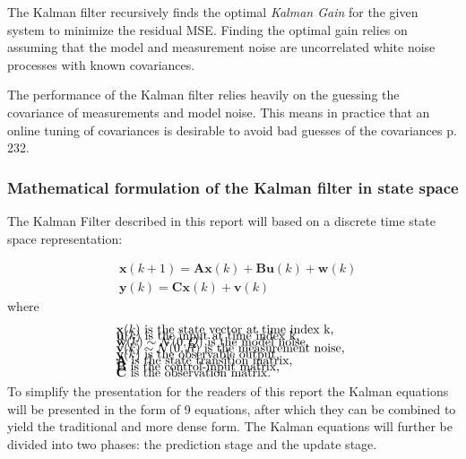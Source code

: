The Kalman filter recursively finds the optimal \textit{Kalman Gain} for the given system to minimize the residual MSE. Finding the optimal gain relies on assuming that the model and measurement noise are uncorrelated white noise processes with known covariances. 

The performance of the Kalman filter relies heavily on the guessing the covariance of measurements and model noise. This means in practice that an online tuning of covariances is desirable to avoid bad guesses of the covariances \cite{Doraiswami2014} p. 232.

\subsubsection{Mathematical formulation of the Kalman filter in state space}
The Kalman Filter described in this report will based on a discrete time state space representation: 

\begin{align}
	&\textbf{x}(k+1) = \textbf{A}\textbf{x}(k) + \textbf{B}\textbf{u}(k) + \textbf{w}(k)  \label{eq:KalmanSystemEquations} \\
	&\textbf{y}(k) = \textbf{C}\textbf{x}(k)+\textbf{v}(k) 
\end{align}
where 
\begin{align*}
	&\text{$\textbf{x}(k)$ is the state vector at time index k,					}	\\[-1em]
	&\text{$\textbf{u}(k)$ is the input at time index k, 						}	\\[-1em]
	&\text{$\textbf{w}(k) \sim \mathcal{N}(0, Q)$ is the model noise,			}	\\[-1em]
	&\text{$\textbf{v}(k) \sim \mathcal{N}(0, R)$ is the measurement noise,		}	\\[-1em]
	&\text{$\textbf{y}(k)$ is the observable output, 							}	\\[-1em]
	&\text{\textbf{A} is the state transition matrix,							}	\\[-1em]
	&\text{\textbf{B} is the control-input matrix,								}	\\[-1em]
	&\text{\textbf{C} is the observation matrix. 								}	\\[-1em]
\end{align*}

To simplify the presentation for the readers of this report the Kalman equations will be presented in the form of 9 equations, after which they can be combined to yield the traditional and more dense form.
The Kalman equations will further be divided into two phases: the prediction stage and the update stage. 

